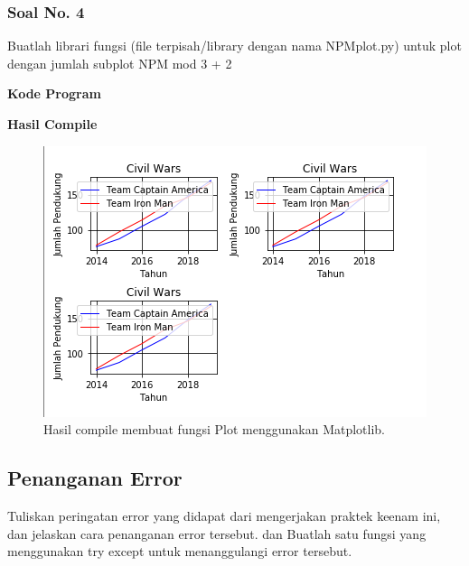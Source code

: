 \subsubsection{Soal No. 4}
\hfill \break
Buatlah librari fungsi (file terpisah/library dengan nama NPMplot.py) untuk plot dengan jumlah subplot NPM mod 3 + 2

\hfill \break
\textbf{Kode Program}



\hfill \break
\textbf{Hasil Compile}

\begin{figure}[H]
	\includegraphics[width=12cm]{figures/6/1174089/Praktek/p4.png}
	\centering
	\caption{Hasil compile membuat fungsi Plot menggunakan Matplotlib.}
\end{figure}


\subsection{Penanganan Error}
Tuliskan  peringatan  error  yang  didapat  dari  mengerjakan  praktek  keenam  ini, dan  jelaskan  cara  penanganan  error  tersebut. dan  Buatlah  satu  fungsi  yang menggunakan try except untuk menanggulangi error tersebut.

